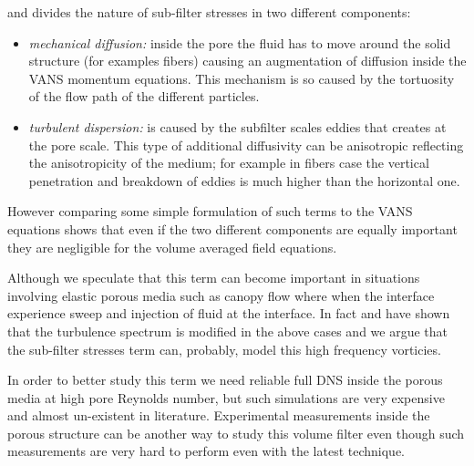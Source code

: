 \citet{breugem2006influence} and \citet{nepf1999drag} divides the nature of sub-filter stresses in two different components:
\begin{itemize}
	\item \textit{mechanical diffusion:} inside the pore the fluid has to move around the solid structure (for examples fibers) causing an augmentation of diffusion inside the VANS momentum equations. This mechanism is so caused by the tortuosity of the flow path of the different particles.
	\item \textit{turbulent dispersion:} is caused by the subfilter scales eddies that creates at the pore scale. This type of additional diffusivity can be anisotropic reflecting the anisotropicity of the medium; for example in fibers case the vertical penetration and breakdown of eddies is much higher than the horizontal one.
\end{itemize}

However comparing some simple formulation of such terms to the VANS equations shows that even if the two different components are equally important they are negligible for the volume averaged field equations.

%

Although we speculate that this term can become important in situations involving elastic porous media such as canopy flow where when the interface experience sweep and injection of fluid at the interface.
In fact \citet{finnigan2000turbulence} and \citet{de2008effects} have shown that the turbulence spectrum is modified in the above cases and we argue that the sub-filter stresses term can, probably, model this high frequency vorticies.

In order to better study this term we need reliable full DNS inside the porous media at high pore Reynolds number, but such simulations are very expensive and almost un-existent in literature.
Experimental measurements inside the porous structure can be another way to study this volume filter even though such measurements are very hard to perform even with the latest technique.

